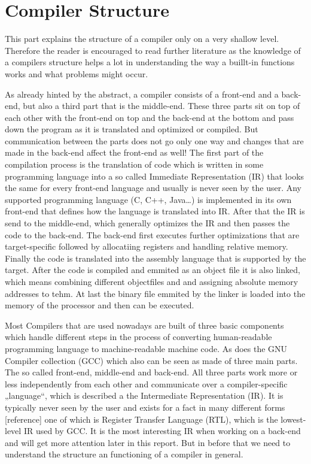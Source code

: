 \chapter{Compiler Structure}
\label{chapter:compiler structure}

This part explains the structure of a compiler only on a very shallow level. Therefore the reader is encouraged to read further literature as the knowledge of a compilers structure helps a lot in understanding the way a buillt-in functions works and what problems might occur.

As already hinted by the abstract, a compiler consists of a front-end and a back-end, but also a third part that is the middle-end. These three parts sit on top of each other with the front-end on top and the back-end at the bottom and pass down the program as it is translated and optimized or compiled. But communication between the parts does not go only one way and changes that are made in the back-end affect the front-end as well!
The first part of the compilation process is the translation of code which is written in some programming language into a so called Immediate Representation (IR) that looks the same for every front-end language and usually is never seen by the user. Any supported programming language (C, C++, Java…) is implemented in its own front-end that defines how the language is translated into IR. After that the IR is send to the middle-end, which generally optimizes the IR and then passes the code to the back-end. The back-end first executes further optimizations that are target-specific followed by allocatiing registers and handling relative memory. Finally the code is translated into the assembly language that is supported by the target.
After the code is compiled and emmited as an object file it is also linked, which means combining different objectfiles and and assigning absolute memory addresses to tehm. At last the binary file emmited by the linker is loaded into the memory of the processor and then can be executed.

Most Compilers that are used nowadays are built of three basic components which handle different steps in the process of converting human-readable programming language to machine-readable machine code. As does the GNU Compiler collection (GCC) which also can be seen as made of three main parts. The so called front-end, middle-end and back-end.
All three parts work more or less independently from each other and communicate over a compiler-specific „language“, which is described a the Intermediate Representation (IR). It is typically never seen by the user and exists for a fact in many different forms [reference] one of which is Register Transfer Language (RTL), which is the lowest-level IR used by GCC. It is the most interesting IR when working on a back-end and will get more attention later in this report. But in before that we need to understand the structure an functioning of a compiler in general.

